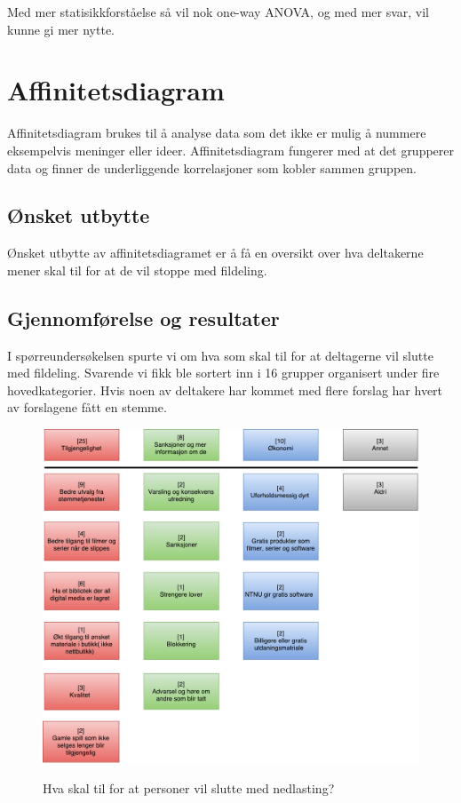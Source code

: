 Med mer statisikkforståelse så vil nok one-way ANOVA, og med mer svar, vil kunne gi mer nytte.  


\section{Affinitetsdiagram}
Affinitetsdiagram brukes til å analyse data som det ikke er mulig å nummere eksempelvis meninger eller ideer. Affinitetsdiagram fungerer med at det grupperer data og finner de underliggende korrelasjoner som kobler sammen gruppen. 

\subsection{Ønsket utbytte}
Ønsket utbytte av affinitetsdiagramet er å få en oversikt over hva deltakerne mener skal til for at de vil stoppe med fildeling.
\subsection{Gjennomførelse og resultater}
I spørreundersøkelsen spurte vi om hva som skal til for at deltagerne vil slutte med fildeling. Svarende vi fikk ble sortert inn i 16 grupper organisert under fire hovedkategorier. Hvis noen av deltakere har kommet med flere forslag har hvert av forslagene fått en stemme.  

\begin{figure}[H]
    \centering
    \includegraphics[scale=0.45]{case_1/bilder/stoppe_nedlasting.pdf}
    \label{fig:stoppe_nedlastning}
    \caption{Hva skal til for at personer vil slutte med nedlasting?}
\end{figure}

